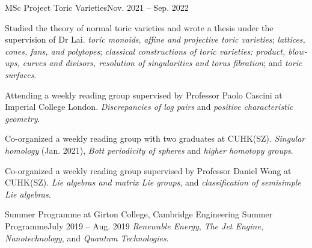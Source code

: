 \HeadingItemListStart
	\HeadingItem
		{MSc Project}{}
		{Toric Varieties}{Nov. 2021 -- Sep. 2022}
		\ItemListStart
			\item Studied the theory of normal toric varieties and wrote a thesis under the supervision of Dr Lai.
				{\textit{toric monoids}, \textit{affine and projective toric varieties};
				\textit{lattices, cones, fans, and polytopes};
				\textit{classical constructions of toric varieties: product, blow-ups, curves and divisors, resolution of singularities and torus fibration};
				 and \textit{toric surfaces}.}
		\ItemListEnd

		\ItemListStart
			\item Attending a weekly reading group supervised by Professor Paolo Cascini at Imperial College London.
				{\textit{Discrepancies of log pairs} and \textit{positive characteristic geometry}.}
		\ItemListEnd
		\ItemListStart
			\item Co-organized a weekly reading group with two graduates at CUHK(SZ).
				{\textit{Singular homology} (Jan. 2021), \textit{Bott periodicity of spheres} and \textit{higher homotopy groups}.}
		\ItemListEnd
		\ItemListStart
			\item Co-organized a weekly reading group supervised by Professor Daniel Wong at CUHK(SZ).
				{\textit{Lie algebras and matrix Lie groups},
				and \textit{classification of semisimple Lie algebras}.}
		\ItemListEnd

	\HeadingItem
		{Summer Programme at Girton College, Cambridge}{}
		{Engineering Summer Programme}{July 2019 -- Aug. 2019}
		\ItemListStart
				{\textit{Renewable Energy}, \textit{The Jet Engine}, \textit{Nanotechnology}, and \textit{Quantum Technologies}.}
		\ItemListEnd
		
\HeadingItemListEnd

